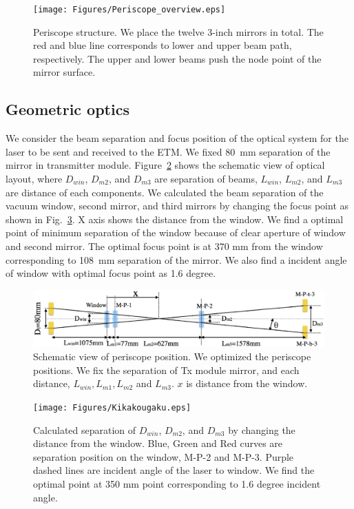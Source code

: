 \begin{figure}
\begin{center}
\texttt{[image: Figures/Periscope\_overview.eps]}
\caption{Periscope structure. We place the twelve 3-inch mirrors in total. The red and blue line corresponds to lower and upper beam path, respectively. The upper and lower beams push the node point of the mirror surface.} 
\label{fig:Periscope_overview} 
\end{center}
\end{figure}

\subsection{Geometric optics}
We consider the beam separation and focus position of the optical system for the laser to be sent and received to the ETM. We fixed 80~mm separation of the mirror in transmitter module.  Figure~\ref{fig:Kikakougaku_position} shows the schematic view of optical layout, where $D_{win}$, $D_{m2}$, and $D_{m3}$ are separation of beams, $L_{win}$, $L_{m2}$, and $L_{m3}$ are distance of each components.  We calculated the beam separation of the vacuum window, second mirror, and third mirrors by changing the focus point as shown in Fig.~\ref{fig:Kikakougaku}. X axis shows the distance from the window. We find a optimal point of minimum separation of the window because of clear aperture of window and second mirror. The optimal focus point is at 370 mm from the window corresponding to 108~mm separation of the mirror. We also find a incident angle of window with optimal focus point as 1.6 degree.




\begin{figure}
\begin{center}
\includegraphics[width=15cm]{Figures/Kikakougaku_position.eps}
\caption{Schematic view of periscope position. We optimized the periscope positions. We fix the separation of Tx module mirror, and each distance, $L_{win}, L_{m1},L_{m2}$ and $L_{m3}$. $x$ is distance from the window.} 
\label{fig:Kikakougaku_position} 
\end{center}
\end{figure}
\begin{figure}
\begin{center}
\texttt{[image: Figures/Kikakougaku.eps]}
\caption{Calculated separation of $D_{win}$, $D_{m2}$, and $D_{m3}$ by changing the distance from the window. Blue, Green and Red curves are separation position on the window, M-P-2 and M-P-3. Purple dashed lines are incident angle of the laser to window. We find the optimal point at 350 mm point corresponding to 1.6 degree incident angle.} 
\label{fig:Kikakougaku} 
\end{center}
\end{figure}

